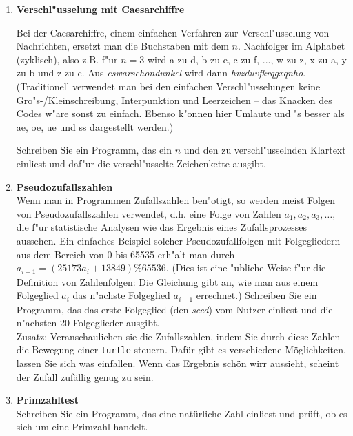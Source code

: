 \begin{enumerate}[1.]
\item \textbf{Verschl"usselung mit Caesarchiffre}

Bei der Caesarchiffre, einem einfachen Verfahren zur Verschl"usselung von
Nachrichten, ersetzt man die Buchstaben mit dem $n$. Nachfolger
im Alphabet (zyklisch), also z.B. f"ur $n = 3$ wird a zu d, b zu e, c zu f,
..., w zu z, x zu a, y zu b und z zu c. Aus \emph{eswarschondunkel}
wird dann \emph{hvzduvfkrqgxqnho}. 
(Traditionell verwendet man bei den einfachen Verschl"usselungen keine
Gro"s-/Kleinschreibung, Interpunktion und Leerzeichen -- das 
\glqq Knacken\grqq{} des Codes w"are sonst zu einfach. Ebenso k"onnen 
hier Umlaute und "s besser als ae, oe, ue und ss dargestellt werden.) 

Schreiben Sie ein Programm, das ein $n$ und den zu verschl"usselnden
Klartext einliest und daf"ur die verschl"usselte Zeichenkette ausgibt.


\item \textbf{Pseudozufallszahlen}\\
Wenn man in Programmen Zufallszahlen ben"otigt, so werden meist Folgen
von Pseudozufallszahlen verwendet, d.h. eine Folge von Zahlen 
$a_1, a_2, a_3, \ldots$, die f"ur statistische Analysen wie das Ergebnis 
eines Zufallsprozesses aussehen.
Ein ein\-fa\-ches Beispiel solcher Pseudozufallfolgen mit Folgegliedern 
aus dem Bereich von 0 bis 65535 erh"alt man durch
$a_{i+1} = (25173 a_i + 13849) \% 65536$.
(Dies ist eine "ubliche Weise f"ur die Definition von Zahlenfolgen: 
Die Gleichung gibt an, wie man aus einem Folgeglied $a_i$ das n"achste 
Folgeglied $a_{i+1}$ errechnet.) 
Schreiben Sie ein Programm, das das erste Folgeglied (den \emph{seed})
vom Nutzer einliest und die n"achsten 20 Folgeglieder
ausgibt.   \\
Zusatz: Veranschaulichen sie die Zufallszahlen, indem Sie durch diese
Zahlen die Bewegung einer \texttt{turtle} steuern. Dafür gibt
es verschiedene Möglichkeiten, lassen Sie sich was einfallen.
Wenn das Ergebnis schön wirr aussieht, scheint der Zufall zufällig genug
zu sein.

\item \textbf{Primzahltest}\\Schreiben Sie ein Programm, das eine natürliche Zahl einliest und 
prüft, ob es sich um eine Primzahl handelt.


\end{enumerate}
